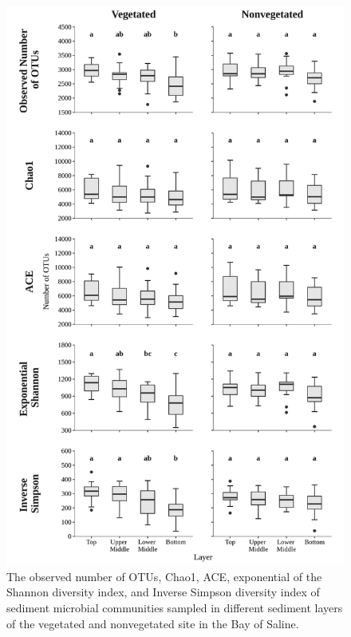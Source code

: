 \documentclass[12pt,]{article}
\begin{document}
\begin{figure}[H]

{\centering \includegraphics[width=0.7\linewidth]{../results/figures/calculators} 

}

\caption{The observed number of OTUs, Chao1, ACE, exponential of the Shannon diversity index, and Inverse Simpson diversity index of sediment microbial communities sampled in different sediment layers of the vegetated and nonvegetated site in the Bay of Saline.\label{calculators}}\label{fig:unnamed-chunk-2}
\end{figure}
\end{document}
